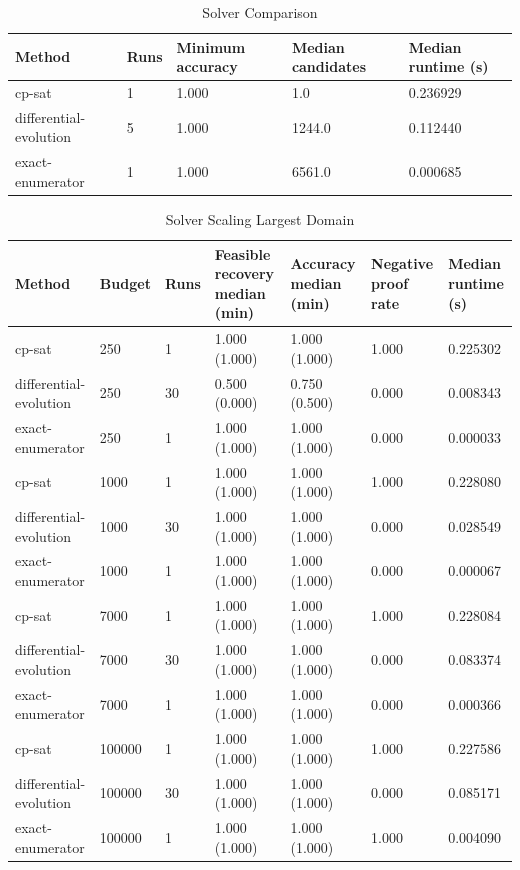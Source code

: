\documentclass[preprint,12pt]{elsarticle}
\begin{document}
\begin{table}[htbp]
\centering
\caption{Solver Comparison}
\small
\begin{tabular}{lllll}
\textbf{Method} & \textbf{Runs} & \textbf{Minimum accuracy} & \textbf{Median candidates} & \textbf{Median runtime (s)} \\
\hline
cp-sat & 1 & 1.000 & 1.0 & 0.236929 \\
differential-evolution & 5 & 1.000 & 1244.0 & 0.112440 \\
exact-enumerator & 1 & 1.000 & 6561.0 & 0.000685 \\
\end{tabular}
\end{table}
\begin{table}[htbp]
\centering
\caption{Solver Scaling Largest Domain}
\small
\begin{tabular}{lllllll}
\textbf{Method} & \textbf{Budget} & \textbf{Runs} & \textbf{Feasible recovery median (min)} & \textbf{Accuracy median (min)} & \textbf{Negative proof rate} & \textbf{Median runtime (s)} \\
\hline
cp-sat & 250 & 1 & 1.000 (1.000) & 1.000 (1.000) & 1.000 & 0.225302 \\
differential-evolution & 250 & 30 & 0.500 (0.000) & 0.750 (0.500) & 0.000 & 0.008343 \\
exact-enumerator & 250 & 1 & 1.000 (1.000) & 1.000 (1.000) & 0.000 & 0.000033 \\
cp-sat & 1000 & 1 & 1.000 (1.000) & 1.000 (1.000) & 1.000 & 0.228080 \\
differential-evolution & 1000 & 30 & 1.000 (1.000) & 1.000 (1.000) & 0.000 & 0.028549 \\
exact-enumerator & 1000 & 1 & 1.000 (1.000) & 1.000 (1.000) & 0.000 & 0.000067 \\
cp-sat & 7000 & 1 & 1.000 (1.000) & 1.000 (1.000) & 1.000 & 0.228084 \\
differential-evolution & 7000 & 30 & 1.000 (1.000) & 1.000 (1.000) & 0.000 & 0.083374 \\
exact-enumerator & 7000 & 1 & 1.000 (1.000) & 1.000 (1.000) & 0.000 & 0.000366 \\
cp-sat & 100000 & 1 & 1.000 (1.000) & 1.000 (1.000) & 1.000 & 0.227586 \\
differential-evolution & 100000 & 30 & 1.000 (1.000) & 1.000 (1.000) & 0.000 & 0.085171 \\
exact-enumerator & 100000 & 1 & 1.000 (1.000) & 1.000 (1.000) & 1.000 & 0.004090 \\
\end{tabular}
\end{table}
\end{document}
